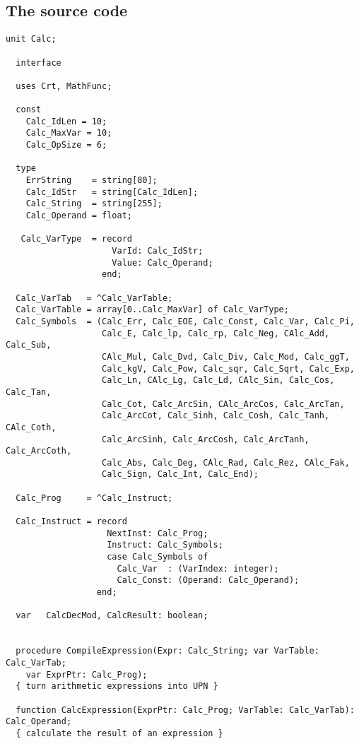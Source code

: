 \begin{refsection}
\section{The source code}

\begin{lstlisting}[caption=Interface]
  unit Calc;

  interface

  uses Crt, MathFunc;

  const
    Calc_IdLen = 10;
    Calc_MaxVar = 10;
    Calc_OpSize = 6;

  type
    ErrString    = string[80];
    Calc_IdStr   = string[Calc_IdLen];
    Calc_String  = string[255];
    Calc_Operand = float;

   Calc_VarType  = record
                     VarId: Calc_IdStr;
                     Value: Calc_Operand;
                   end;

  Calc_VarTab   = ^Calc_VarTable;
  Calc_VarTable = array[0..Calc_MaxVar] of Calc_VarType;
  Calc_Symbols  = (Calc_Err, Calc_EOE, Calc_Const, Calc_Var, Calc_Pi,
                   Calc_E, Calc_lp, Calc_rp, Calc_Neg, CAlc_Add, Calc_Sub,
                   CAlc_Mul, Calc_Dvd, Calc_Div, Calc_Mod, Calc_ggT,
                   Calc_kgV, Calc_Pow, Calc_sqr, Calc_Sqrt, Calc_Exp,
                   Calc_Ln, CAlc_Lg, Calc_Ld, CAlc_Sin, Calc_Cos, Calc_Tan,
                   Calc_Cot, Calc_ArcSin, CAlc_ArcCos, Calc_ArcTan,
                   Calc_ArcCot, Calc_Sinh, Calc_Cosh, Calc_Tanh, CAlc_Coth,
                   Calc_ArcSinh, Calc_ArcCosh, Calc_ArcTanh, Calc_ArcCoth,
                   Calc_Abs, Calc_Deg, CAlc_Rad, Calc_Rez, CAlc_Fak,
                   Calc_Sign, Calc_Int, Calc_End);

  Calc_Prog     = ^Calc_Instruct;

  Calc_Instruct = record
                    NextInst: Calc_Prog;
                    Instruct: Calc_Symbols;
                    case Calc_Symbols of
                      Calc_Var  : (VarIndex: integer);
                      Calc_Const: (Operand: Calc_Operand);
                  end;

  var   CalcDecMod, CalcResult: boolean;


  procedure CompileExpression(Expr: Calc_String; var VarTable: Calc_VarTab;
    var ExprPtr: Calc_Prog);
  { turn arithmetic expressions into UPN }

  function CalcExpression(ExprPtr: Calc_Prog; VarTable: Calc_VarTab): Calc_Operand;
  { calculate the result of an expression }


\end{lstlisting}
\end{refsection}
